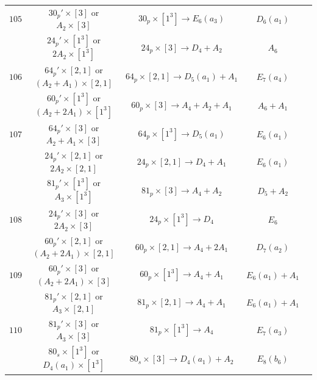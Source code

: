 \documentclass[reqno,12pt]{amsart}
\numberwithin{equation}{section}
\theoremstyle{plain}
\theoremstyle{definition}
\begin{document}
\begin{table}[htbp]
\begin{tabular}{|c|c|c|c|c|}
 $ 105 $    & $30_p'\times [3] $ or $A_2\times [3]$ &  $30_p\times[1^3]\rightarrow E_6(a_3) $     &   $ D_6(a_1)$     \\ 
         &  $24_p'\times [1^3] $ or $2A_2\times [1^3]$ &  $24_p\times[3]\rightarrow D_4+A_2 $     &   $ A_6$    \\ \hline
 $ 106 $    & $64_p'\times [2,1] $ or $(A_2+A_1)\times [2,1]$ &  $64_p\times[2,1]\rightarrow D_5(a_1)+A_1 $     &   $ E_7(a_4)$     \\ 
         &  $60_p'\times [1^3] $ or $(A_2+2A_1)\times [1^3]$ &  $60_p\times[3]\rightarrow A_4+A_2+A_1 $     &   $ A_6+A_1$    \\ \hline
 $ 107 $    & $64_p'\times [3] $ or $A_2+A_1\times [3]$ &  $64_p\times[1^3]\rightarrow D_5(a_1) $     &   $ E_6(a_1)$     \\ 
         &  $24_p'\times [2,1] $ or $2A_2\times [2,1]$ &  $24_p\times[2,1]\rightarrow D_4+A_1 $     &   $ E_6(a_1)$    \\ 
      &  $81_p'\times [1^3] $ or $A_3\times [1^3]$ &  $81_p\times[3]\rightarrow A_4+A_2 $     &   $ D_5+A_2$    \\   
         \hline
 
 $ 108 $    & $24_p'\times [3] $ or $2A_2\times [3]$ &  $24_p\times[1^3]\rightarrow D_4 $     &   $ E_6$     \\ 
         &  $60_p'\times [2,1] $ or $(A_2+2A_1)\times [2,1]$ &  $60_p\times[2,1]\rightarrow A_4+2A_1 $     &   $ D_7(a_2)$    \\  
         \hline

  $ 109 $    & $60_p'\times [3] $ or $(A_2+2A_1)\times [3]$ &  $60_p\times[1^3]\rightarrow A_4+A_1 $     &   $ E_6(a_1)+A_1$     \\ 
         &  $81_p'\times [2,1] $ or $A_3\times [2,1]$ &  $81_p\times[2,1]\rightarrow A_4+A_1 $     &   $ E_6(a_1)+A_1$    \\  
         \hline  

$ 110 $    & $81_p'\times [3] $ or $A_3\times [3]$ &  $81_p\times[1^3]\rightarrow A_4 $     &   $ E_7(a_3)$     \\ 
         &  $80_s\times [1^3] $ or $D_4(a_1)\times [1^3]$ &  $80_s\times[3]\rightarrow D_4(a_1)+A_2 $     &   $ E_8(b_6)$    \\
         \hline


\end{tabular}
\end{table}
\end{document}
